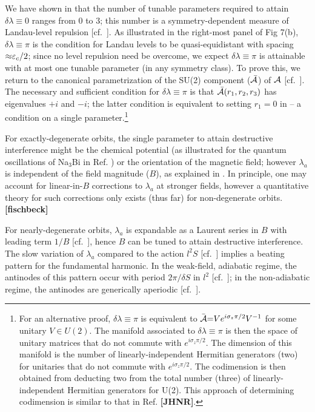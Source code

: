 \documentclass[aps, prb, showpacs, twocolumn, notitlepage, superscriptaddress]{revtex4-1}
\begin{document}
We have shown in  that  the number of tunable parameters required to attain  $\delta \lambda{\equiv}0$ ranges from $0$ to $3$; this number is a symmetry-dependent measure of Landau-level repulsion [cf.\ ]. As illustrated in the right-most panel of Fig 7(b), $\delta \lambda{\equiv}\pi$ is the condition  for Landau levels to be quasi-equidistant  with spacing ${\approx}\varepsilon_c/2$; since no level repulsion need be overcome,
we expect $\delta \lambda{\equiv}\pi$ is attainable with at most one tunable parameter (in any symmetry class). To prove this, we return to the canonical parametrization of the SU(2) component (${\cal \bar{A}}$) of ${\cal A}$ [cf.\ ]. The necessary and sufficient condition for $\delta \lambda{\equiv}\pi$ is that ${\cal \bar{A}}(r_1,r_2,r_3)$ has eigenvalues $+i$ and $-i$; the latter condition is equivalent to setting $r_1{=}0$ in  -- a condition on a single parameter.\footnote{For an alternative proof,  $\delta \lambda{\equiv}\pi$ is equivalent to ${ \bar{\cal A}}{=}Ve^{i\sigma_z\pi/2}V^{-1}$ for some unitary $V\in U(2)$. The manifold associated to $\delta \lambda{\equiv}\pi$ is then the space of unitary matrices  that do not commute with $e^{i\sigma_z\pi/2}$. The dimension of this manifold is the number of linearly-independent Hermitian generators (two) for unitaries that do not commute with $e^{i\sigma_z\pi/2}$. The codimension is then obtained from deducting two from the total number (three)  of linearly-independent Hermitian generators  for U(2). This approach of determining codimension is similar to that in Ref. \textbf{[JHNR]}.} 

For exactly-degenerate orbits, the single parameter to attain destructive interference might be the chemical potential (as illustrated for the quantum oscillations of Na$_3$Bi in Ref. ) or the orientation of the magnetic field; however $\lambda_a$ is independent of the field magnitude ($B$), as explained in . In principle, one may account for linear-in-$B$ corrections to $\lambda_a$ at stronger fields, however a quantitative theory for such corrections only exists (thus far) for non-degenerate orbits\cite{rothmag,fuchs_landau_2017,gao_zero-field_2017}.\textbf{[fischbeck]} 

For nearly-degenerate orbits, $\lambda_a$ is expandable as a Laurent series in $B$ with leading term $1/B$ [cf.\ ], hence $B$ can be tuned to attain destructive interference. The slow variation of $\lambda_a$ compared to the action $l^2S$ [cf.\ ] implies a beating pattern for the fundamental harmonic. In the weak-field, adiabatic regime, the antinodes of this pattern occur with period $2\pi/\delta S$ in $l^2$ [cf.\ ]; in the non-adiabatic regime, the antinodes are generically aperiodic [cf.\ ]. 
\end{document}
